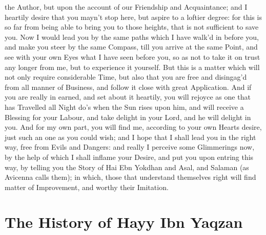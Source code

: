 \documentclass[12pt]{article}
\begin{document}
the Author, but upon the account of our Friendship and Acquaintance; and I heartily desire that you mayn't stop here, but aspire to a loftier degree: for this is so far from being able to bring you to those heights, that is not sufficient to save you. Now I would lead you by the same paths which I have walk'd in before you, and make you steer by the same Compass, till you arrive at the same Point, and see with your own Eyes what I have seen before you, so as not to take it on trust any longer from me, but to experience it yourself. But this is a matter which will not only require considerable Time, but also that you are free and disingag'd from all manner of Business, and follow it close with great Application. And if you are really in earned, and set about it heartily, you will rejoyce as one that has Travelled all Night do's when the Sun rises upon him, and will receive a Blessing for your Labour, and take delight in your Lord, and he will delight in you. And for my own part, you will find me, according to your own Hearts desire, just such an one as you could wish; and I hope that I shall lead you in the right way, free from Evils and Dangers: and really I perceive some Glimmerings now, by the help of which I shall inflame your Desire, and put you upon entring this way, by telling you the Story of Hai Ebn Yokdhan and Asal, and Salaman (as Avicenna calls them); in which, those that understand themselves right will find matter of Improvement, and worthy their Imitation.

\section*{The History of Hayy Ibn Yaqzan}
\end{document}
